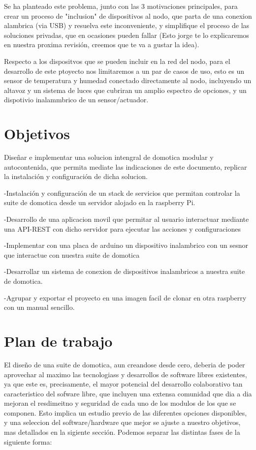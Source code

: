 Se ha planteado este problema, junto con las 3 motivaciones principales, para crear un proceso de "inclusion" de dispositivos al nodo, que parta de una conexion alambrica (via USB) y resuelva este inconveniente, y simplifique el proceso de las soluciones privadas, que en ocasiones pueden fallar (Esto jorge te lo explicaremos en nuestra proxima revisión, creemos que te va a gustar la idea).

Respecto a los dispositvos que se pueden incluir en la red del nodo, para el desarrollo de este ptoyecto nos limitaremos a un par de casos de uso, esto es un sensor de temperatura y humedad conectado directamente al nodo, incluyendo un altavoz y un sistema de luces que cubriran un amplio espectro de opciones, y un dispotivio inalammbrico de un sensor/actuador.


\section{Objetivos}
\label{ch:Capitulo1.2}

Diseñar e implementar una solucion intengral de domotica modular y autocontenida, que permita mediate las indicaciones de este documento, replicar la instalación y configuración de dicha solucion.

-Instalación y configuración de un stack de servicios que permitan controlar la suite de domotica desde un servidor alojado en la raspberry Pi.

-Desarrollo de una aplicacion movil que permitar al usuario interactuar mediante una API-REST con dicho servidor para ejecutar las acciones y configuraciones

-Implementar con una placa de arduino un dispositivo inalambrico con un sesnor que interactue con nuestra suite de domotica

-Desarrollar un sistema de conexion de dispositivos inalambricos a nuestra suite de domotica.

-Agrupar y exportar el proyecto en una imagen facil de clonar en otra raspberry con un manual sencillo.

\section{Plan de trabajo}
\label{ch:Capitulo1.3}

El diseño de una suite de domotica, aun creandose desde cero, deberia de poder aprovechar al maximo las tecnologiass y desarrollos de software libres existentes, ya que este es, precisamente, el mayor potencial del desarrollo colaborativo tan caracteristico del sofware libre, que incluyen una extensa comunidad que dia a dia mejoran el resdimeitno y seguridad de cada uno de los modulos de los que se componen. Esto implica un estudio previo de las diferentes opciones disponibles, y una seleccion del software/hardware que mejor se ajuste a nuestro objetivos, mas detallados en la sigiente sección. Podemos separar las distintas fases de la siguiente forma:

